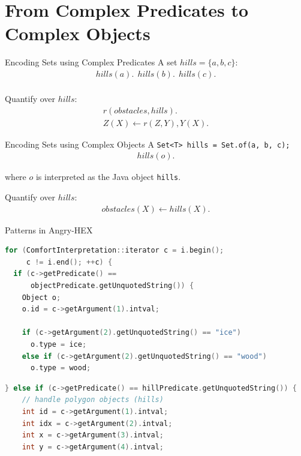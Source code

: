 \documentclass[smaller, dvipsnames]{beamer}
\newcommand{\ah}{Angry-HEX\xspace}
\begin{document}
\section{From Complex Predicates to Complex Objects}

\begin{frame}{Encoding Sets using Complex Predicates}
	A set \(hills = \{ a, b, c \}\):
    \begin{align*}
    	hills(a).~~hills(b).~~hills(c). \\
    \end{align*}

	Quantify over \(hills\):
	\begin{align*}
		r(obstacles,hills). \\
		Z(X) \leftarrow r(Z,Y), Y(X).
	\end{align*}
\end{frame}

\begin{frame}{Encoding Sets using Complex Objects}
	A \texttt{Set<T> hills = Set.of(a, b, c);}
    \begin{align*}
    	hills(o).
    \end{align*}

	where \(o\) is interpreted as the Java object \texttt{hills}.

	Quantify over \(hills\):
	\begin{align*}
		obstacles(X) \leftarrow hills(X).
	\end{align*}
\end{frame}

\begin{frame}[fragile]{Patterns in \ah}
\begin{lstlisting}[language=C++,basicstyle=\ttfamily\small,keywordstyle=\color{red}]
for (ComfortInterpretation::iterator c = i.begin();
     c != i.end(); ++c) {
  if (c->getPredicate() ==
      objectPredicate.getUnquotedString()) {
    Object o;
    o.id = c->getArgument(1).intval;

    if (c->getArgument(2).getUnquotedString() == "ice")
      o.type = ice;
    else if (c->getArgument(2).getUnquotedString() == "wood")
      o.type = wood;
\end{lstlisting}

\begin{lstlisting}[language=C++,basicstyle=\ttfamily\small,keywordstyle=\color{red}]
  } else if (c->getPredicate() == hillPredicate.getUnquotedString()) {
    // handle polygon objects (hills)
    int id = c->getArgument(1).intval;
    int idx = c->getArgument(2).intval;
    int x = c->getArgument(3).intval;
    int y = c->getArgument(4).intval;
\end{lstlisting}
\end{frame}
\end{document}
